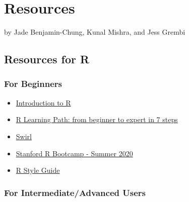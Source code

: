 \documentclass[
]{book}
\providecommand{\tightlist}{%
  \setlength{\itemsep}{0pt}\setlength{\parskip}{0pt}}
\begin{document}
\chapter{Resources}\label{resources}

by Jade Benjamin-Chung, Kunal Mishra, and Jess Grembi

\section{Resources for R}\label{resources-for-r}

\subsection{For Beginners}\label{for-beginners}

\begin{itemize}
\tightlist
\item
  \href{https://monashdatafluency.github.io/r-intro-2/}{Introduction to R}
\item
  \href{https://www.kdnuggets.com/2016/03/datacamp-r-learning-path-7-steps.html}{R Learning Path: from beginner to expert in 7 steps}
\item
  \href{https://swirlstats.com/students.html}{Swirl}
\item
  \href{https://biox-rbootcamp.github.io/material}{Stanford R Bootcamp - Summer 2020}
\item
  \href{http://adv-r.had.co.nz/Style.html}{R Style Guide}
\end{itemize}

\subsection{For Intermediate/Advanced Users}\label{for-intermediateadvanced-users}
\end{document}
